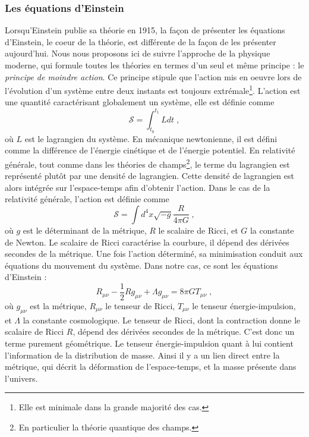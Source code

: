 \subsubsection{Les équations d'Einstein}
Lorsqu'Einstein publie sa théorie en 1915, la façon de présenter les équations d'Einstein, le coeur de la théorie, est différente de la façon de les présenter aujourd'hui. Nous nous proposons ici de suivre l'approche de la physique moderne, qui formule toutes les théories en termes d'un seul et même principe : le \emph{principe de moindre action}. Ce principe stipule que l'action mis en oeuvre lors de l'évolution d'un système entre deux instants est toujours extrémale\footnote{Elle est minimale dans la grande majorité des cas.}. L'action est une quantité caractérisant globalement un système, elle est définie comme
\begin{equation}
  \label{eq:action}
  \mathcal{S} = \int_{t_0}^{t_1} L dt \; ,
\end{equation}
où $L$ est le lagrangien du système. En mécanique newtonienne, il est défini comme la différence de l'énergie cinétique et de l'énergie potentiel. En relativité générale, tout comme dans les théories de champs\footnote{En particulier la théorie quantique des champs.}, le terme du lagrangien est représenté plutôt par une densité de lagrangien. Cette densité de lagrangien est alors intégrée sur l'espace-temps afin d'obtenir l'action. Dans le cas de la relativité générale, l'action est définie comme
\begin{equation}
  \label{eq:actionrg}
  \mathcal{S} = \int d^4x \sqrt{-g} \frac{R}{4 \pi G}  \; ,
\end{equation}
où $g$ est le déterminant de la métrique, $R$ le scalaire de Ricci, et $G$ la constante de Newton. Le scalaire de Ricci caractérise la courbure, il dépend des dérivées secondes de la métrique. Une fois l'action déterminé, sa minimisation conduit aux équations du mouvement du système. Dans notre cas, ce sont les équations d'Einstein :
\begin{equation}
  \label{eq:einstein}
  R_{\mu \nu} - \frac{1}{2} R g_{\mu \nu} + \Lambda g_{\mu \nu} = 8 \pi G T_{\mu \nu} \; ,
\end{equation}
où $g_{\mu \nu}$ est la métrique, $R_{\mu \nu}$ le tenseur de Ricci, $T_{\mu \nu}$ le tenseur énergie-impulsion, et $\Lambda$ la constante cosmologique. Le tenseur de Ricci, dont la contraction donne le scalaire de Ricci $R$, dépend des dérivées secondes de la métrique. C'est donc un terme purement géométrique. Le tenseur énergie-impulsion quant à lui contient l'information de la distribution de masse. Ainsi il y a un lien direct entre la métrique, qui décrit la déformation de l'espace-temps, et la masse présente dans l'univers.

